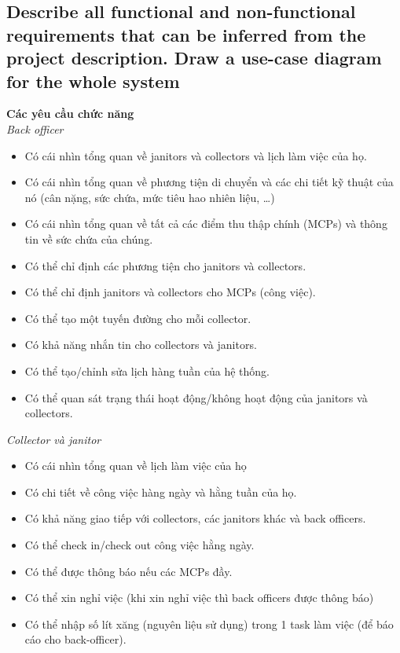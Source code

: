 \documentclass[a4paper]{article}
\begin{document}
\subsection{Describe all functional and non-functional requirements that can be inferred from the project description. Draw a use-case diagram for the whole system}
\textbf{Các yêu cầu chức năng}\\
\textit{Back officer}
\begin{itemize}
\item Có cái nhìn tổng quan về janitors và collectors và lịch làm việc của họ.
\item Có cái nhìn tổng quan về phương tiện di chuyển và các chi tiết kỹ thuật của nó (cân nặng, sức chứa, mức tiêu hao nhiên liệu, …)
\item Có cái nhìn tổng quan về tất cả các điểm thu thập chính (MCPs) và thông tin về sức chứa của chúng. 
\item Có thể chỉ định các phương tiện cho janitors và collectors.
\item Có thể chỉ định janitors và collectors cho MCPs (công việc).
\item Có thể tạo một tuyến đường cho mỗi collector.
\item Có khả năng nhắn tin cho collectors và janitors.
\item Có thể tạo/chỉnh sửa lịch hàng tuần của hệ thống.
\item Có thể quan sát trạng thái hoạt động/không hoạt động của janitors và collectors.
\end{itemize}
\textit{Collector và janitor}
\begin{itemize}

\item Có cái nhìn tổng quan về lịch làm việc của họ
\item Có chi tiết về công việc hàng ngày và hằng tuần của họ.
\item Có khả năng giao tiếp với collectors, các janitors khác và back officers.
\item Có thể check in/check out công việc hằng ngày.
\item Có thể được thông báo nếu các MCPs đầy.
\item Có thể xin nghỉ việc (khi xin nghỉ việc thì back officers được thông báo)
\item Có thể nhập số lít xăng (nguyên liệu sử dụng) trong 1 task làm việc (để báo cáo cho back-officer).
\end{itemize}
\end{document}
